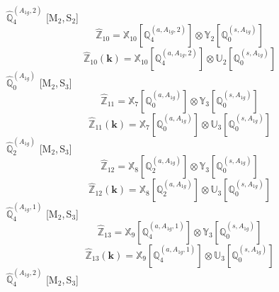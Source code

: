 \documentclass[fleqn,10pt,landscape]{article}
\begin{document}
\begin{itemize}
\begin{dmath*}
\end{dmath*}
\vspace{4mm}
\noindent {} $\,\,\,\hat{\mathbb{Q}}_{4}^{(A_{1g},2)}$ [M$_{2}$,\,S$_{2}$]
\begin{dmath*}
\hat{\mathbb{Z}}_{10}=\mathbb{X}_{10}[\mathbb{Q}_{4}^{(a,A_{1g},2)}] \otimes\mathbb{Y}_{2}[\mathbb{Q}_{0}^{(s,A_{1g})}]
\end{dmath*}
\begin{dmath*}
\hat{\mathbb{Z}}_{10}(\bm{k})=\mathbb{X}_{10}[\mathbb{Q}_{4}^{(a,A_{1g},2)}] \otimes\mathbb{U}_{2}[\mathbb{Q}_{0}^{(s,A_{1g})}]
\end{dmath*}
\vspace{4mm}
\noindent {} $\,\,\,\hat{\mathbb{Q}}_{0}^{(A_{1g})}$ [M$_{2}$,\,S$_{3}$]
\begin{dmath*}
\hat{\mathbb{Z}}_{11}=\mathbb{X}_{7}[\mathbb{Q}_{0}^{(a,A_{1g})}] \otimes\mathbb{Y}_{3}[\mathbb{Q}_{0}^{(s,A_{1g})}]
\end{dmath*}
\begin{dmath*}
\hat{\mathbb{Z}}_{11}(\bm{k})=\mathbb{X}_{7}[\mathbb{Q}_{0}^{(a,A_{1g})}] \otimes\mathbb{U}_{3}[\mathbb{Q}_{0}^{(s,A_{1g})}]
\end{dmath*}
\vspace{4mm}
\noindent {} $\,\,\,\hat{\mathbb{Q}}_{2}^{(A_{1g})}$ [M$_{2}$,\,S$_{3}$]
\begin{dmath*}
\hat{\mathbb{Z}}_{12}=\mathbb{X}_{8}[\mathbb{Q}_{2}^{(a,A_{1g})}] \otimes\mathbb{Y}_{3}[\mathbb{Q}_{0}^{(s,A_{1g})}]
\end{dmath*}
\begin{dmath*}
\hat{\mathbb{Z}}_{12}(\bm{k})=\mathbb{X}_{8}[\mathbb{Q}_{2}^{(a,A_{1g})}] \otimes\mathbb{U}_{3}[\mathbb{Q}_{0}^{(s,A_{1g})}]
\end{dmath*}
\vspace{4mm}
\noindent {} $\,\,\,\hat{\mathbb{Q}}_{4}^{(A_{1g},1)}$ [M$_{2}$,\,S$_{3}$]
\begin{dmath*}
\hat{\mathbb{Z}}_{13}=\mathbb{X}_{9}[\mathbb{Q}_{4}^{(a,A_{1g},1)}] \otimes\mathbb{Y}_{3}[\mathbb{Q}_{0}^{(s,A_{1g})}]
\end{dmath*}
\begin{dmath*}
\hat{\mathbb{Z}}_{13}(\bm{k})=\mathbb{X}_{9}[\mathbb{Q}_{4}^{(a,A_{1g},1)}] \otimes\mathbb{U}_{3}[\mathbb{Q}_{0}^{(s,A_{1g})}]
\end{dmath*}
\vspace{4mm}
\noindent {} $\,\,\,\hat{\mathbb{Q}}_{4}^{(A_{1g},2)}$ [M$_{2}$,\,S$_{3}$]
\begin{dmath*}

\end{dmath*}
\end{itemize}
\end{document}
